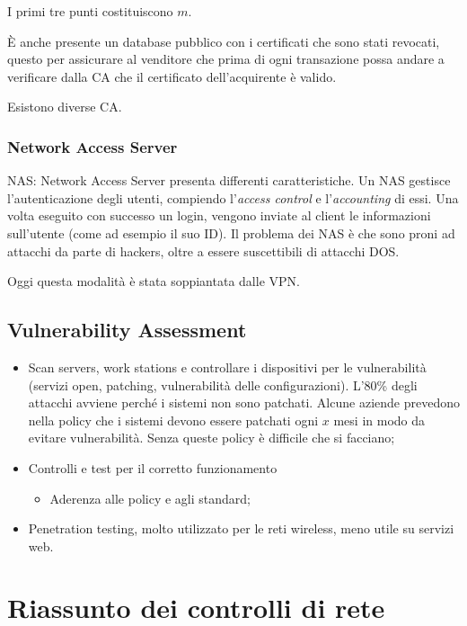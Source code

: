 I primi tre punti costituiscono $m$.

È anche presente un database pubblico con i certificati che sono stati 
revocati, questo per assicurare al venditore che prima di ogni transazione 
possa andare a verificare dalla CA che il certificato dell'acquirente è valido.

Esistono diverse CA.


\subsubsection{Network Access Server}

NAS: Network Access Server presenta differenti caratteristiche. Un NAS gestisce
l'autenticazione degli utenti, compiendo l'\textit{access control} e
l'\textit{accounting} di essi. Una volta eseguito con successo un login,
vengono inviate al client le informazioni sull'utente (come ad esempio il suo
ID). Il problema dei NAS è che sono proni ad attacchi da parte di hackers, 
oltre a essere suscettibili di attacchi DOS.

Oggi questa modalità è stata soppiantata dalle VPN.

\subsection{Vulnerability Assessment}

\begin{itemize}
\item Scan servers, work stations e controllare i dispositivi per le
vulnerabilità (servizi open, patching, vulnerabilità delle configurazioni).
L'80\% degli attacchi avviene perché i sistemi non sono patchati. Alcune 
aziende prevedono nella policy che i sistemi devono essere patchati ogni $x$ 
mesi in modo da evitare vulnerabilità. Senza queste policy è difficile che si 
facciano;
\item Controlli e test per il corretto funzionamento
\begin{itemize}
 \item Aderenza alle policy e agli standard;
\end{itemize}
\item Penetration testing, molto utilizzato per le reti wireless, meno utile su
servizi web.
\end{itemize}

\section{Riassunto dei controlli di rete}

